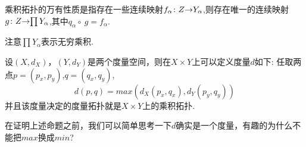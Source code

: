 \begin{definition}
乘积拓扑的万有性质是指存在一些连续映射${f_\alpha}\colon{Z}{\to}{Y_\alpha}$,则存在唯一的连续映射${g}\colon{Z}{\to}{\prod Y_\alpha}$,其中$q_\alpha \circ \ g = f_\alpha$.
\begin{center}
\end{center}
注意$\prod Y_\alpha$表示无穷乘积.
\end{definition}


\begin{example}
设$(X,d_X)$，$(Y,d_Y)$是两个度量空间，则在$X \times Y$上可以定义度量$d$如下: 任取两点$p=(p_x,p_y)$,$q=(q_x,q_y)$,\[d(p,q)=max(d_X(p_x,q_x),d_Y(p_y,q_y))\]并且该度量决定的度量拓扑就是$X \times Y$上的乘积拓扑.
\end{example}

在证明上述命题之前，我们可以简单思考一下$d$确实是一个度量，有趣的为什么不能把$max$换成$min$?


